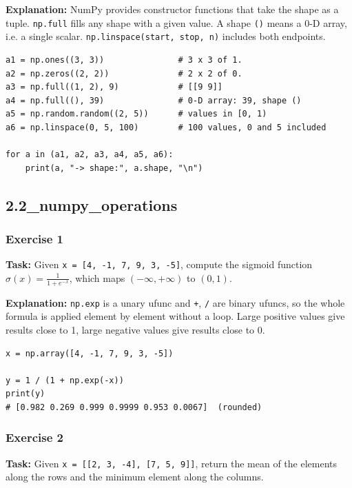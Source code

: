 \textbf{Explanation:} NumPy provides constructor functions that take the shape as a tuple. \texttt{np.full} fills any shape with a given value. A shape \texttt{()} means a 0-D array, i.e. a single scalar. \texttt{np.linspace(start, stop, n)} includes both endpoints.

\begin{lstlisting}[caption={Creating arrays with constructor functions.}]
a1 = np.ones((3, 3))               # 3 x 3 of 1.
a2 = np.zeros((2, 2))              # 2 x 2 of 0.
a3 = np.full((1, 2), 9)            # [[9 9]]
a4 = np.full((), 39)               # 0-D array: 39, shape ()
a5 = np.random.random((2, 5))      # values in [0, 1)
a6 = np.linspace(0, 5, 100)        # 100 values, 0 and 5 included

for a in (a1, a2, a3, a4, a5, a6):
    print(a, "-> shape:", a.shape, "\n")
\end{lstlisting}

\subsection{2.2\_numpy\_operations}

\subsubsection{Exercise 1}
\textbf{Task:} Given \texttt{x = [4, -1, 7, 9, 3, -5]}, compute the sigmoid function $\sigma(x) = \frac{1}{1 + e^{-x}}$, which maps $(-\infty, +\infty)$ to $(0, 1)$.

\textbf{Explanation:} \texttt{np.exp} is a unary ufunc and \texttt{+}, \texttt{/} are binary ufuncs, so the whole formula is applied element by element without a loop. Large positive values give results close to 1, large negative values give results close to 0.

\begin{lstlisting}[caption={Sigmoid function with ufuncs.}]
x = np.array([4, -1, 7, 9, 3, -5])

y = 1 / (1 + np.exp(-x))
print(y)
# [0.982 0.269 0.999 0.9999 0.953 0.0067]  (rounded)
\end{lstlisting}

\subsubsection{Exercise 2}
\textbf{Task:} Given \texttt{x = [[2, 3, -4], [7, 5, 9]]}, return the mean of the elements along the rows and the minimum element along the columns.

